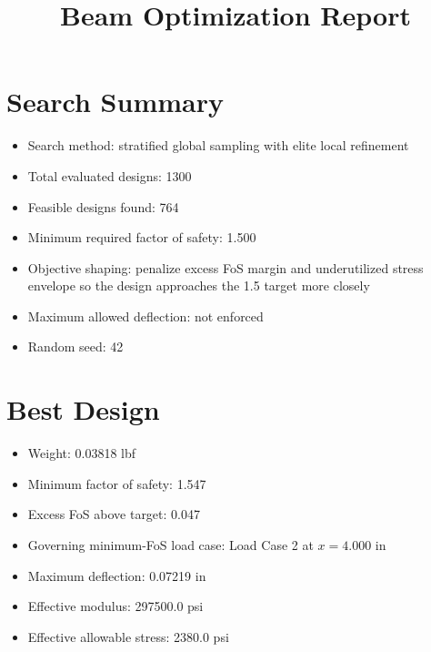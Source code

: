 \documentclass[11pt]{article}
\title{Beam Optimization Report}
\date{}
\begin{document}
\maketitle

\section*{Search Summary}
\begin{itemize}
\item Search method: stratified global sampling with elite local refinement
\item Total evaluated designs: 1300
\item Feasible designs found: 764
\item Minimum required factor of safety: 1.500
\item Objective shaping: penalize excess FoS margin and underutilized stress envelope so the design approaches the 1.5 target more closely
\item Maximum allowed deflection: not enforced
\item Random seed: 42
\end{itemize}

\section*{Best Design}
\begin{itemize}
\item Weight: 0.03818 lbf
\item Minimum factor of safety: 1.547
\item Excess FoS above target: 0.047
\item Governing minimum-FoS load case: Load Case 2 at $x=4.000$ in
\item Maximum deflection: 0.07219 in
\item Effective modulus: 297500.0 psi
\item Effective allowable stress: 2380.0 psi
\end{itemize}
\end{document}
